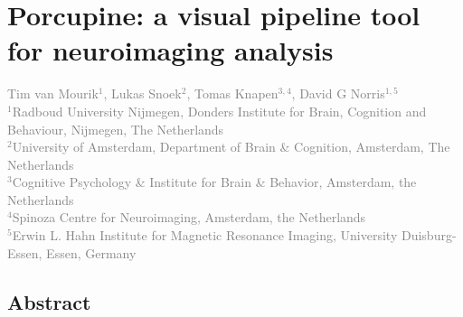 \chapter{Porcupine: a visual pipeline tool for neuroimaging analysis}
\label{ch:porcupine}
\thispagestyle{empty}

\textcolor{gray}{{Tim van Mourik$^{1}$}, Lukas Snoek$^{2}$, Tomas Knapen$^{3,4}$, David G Norris$^{1,5}$\\
$^{1}$Radboud University Nijmegen, Donders Institute for Brain, Cognition and Behaviour, Nijmegen, The Netherlands \\
$^{2}$University of Amsterdam, Department of Brain \& Cognition, Amsterdam, The Netherlands\\
$^{3}$Cognitive Psychology \& Institute for Brain \& Behavior, Amsterdam, the Netherlands\\
$^{4}$Spinoza Centre for Neuroimaging, Amsterdam, the Netherlands \\
$^{5}$Erwin L. Hahn Institute for Magnetic Resonance Imaging, University Duisburg-Essen, Essen, Germany}\\


\newpage
\section*{Abstract}

\newpage







